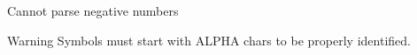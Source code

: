
\begin{DoxyRefList}
\item[\label{bug__bug000001}%
\hypertarget{bug__bug000001}{}%
Global \hyperlink{expression__lite_8h_a63988c00ace0261c4896f132f5f86fda}{string\+\_\+to\+\_\+expression} (size\+\_\+t str\+\_\+len, char const $\ast$str)]Cannot parse negative numbers \begin{DoxyWarning}{Warning}
Symbols must start with A\+L\+P\+H\+A chars to be properly identified.
\end{DoxyWarning}

\end{DoxyRefList}